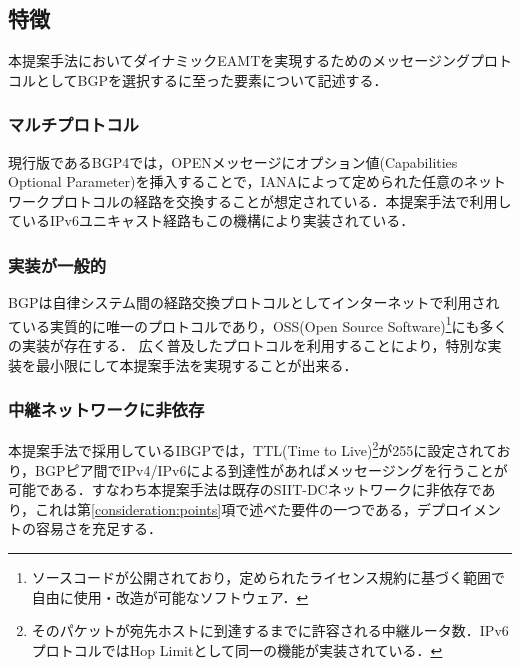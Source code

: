 {\subsection{特徴}
本提案手法においてダイナミックEAMTを実現するためのメッセージングプロトコルとしてBGPを選択するに至った要素について記述する．

\subsubsection{マルチプロトコル}
現行版であるBGP4では，OPENメッセージにオプション値(Capabilities Optional Parameter)を挿入することで，IANAによって定められた任意のネットワークプロトコル\cite{IANA_AFI,IANA_SAFI}の経路を交換することが想定されている\cite{RFC4760}．本提案手法で利用しているIPv6ユニキャスト経路もこの機構により実装されている．


\subsubsection{実装が一般的}
BGPは自律システム間の経路交換プロトコルとしてインターネットで利用されている実質的に唯一のプロトコルであり，OSS(Open Source Software)\footnote{ソースコードが公開されており，定められたライセンス規約に基づく範囲で自由に使用・改造が可能なソフトウェア．}にも多くの実装が存在する．
広く普及したプロトコルを利用することにより，特別な実装を最小限にして本提案手法を実現することが出来る．

\subsubsection{中継ネットワークに非依存}
本提案手法で採用しているIBGPでは，TTL(Time to Live)\footnote{そのパケットが宛先ホストに到達するまでに許容される中継ルータ数．IPv6プロトコルではHop Limitとして同一の機能が実装されている\cite{RFC8200}．}が255に設定されており，BGPピア間でIPv4/IPv6による到達性があればメッセージングを行うことが可能である．すなわち本提案手法は既存のSIIT-DCネットワークに非依存であり，これは第\ref{consideration:points}項で述べた要件の一つである，デプロイメントの容易さを充足する．


}

